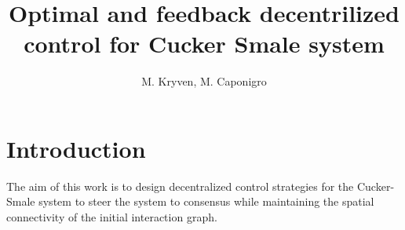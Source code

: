 \documentclass[a4paper,10pt, english]{article}
\begin{document}
\title{Optimal and feedback decentrilized control for Cucker Smale system}
\author{M. Kryven, M. Caponigro}
\maketitle








\section{Introduction}
The aim of this work is to design  decentralized control strategies for the Cucker-Smale system to steer the system to consensus while maintaining the spatial connectivity of the initial interaction graph.
\end{document}

